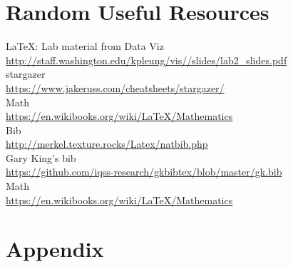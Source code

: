 \documentclass[12pt]{article}
\theoremstyle{hypotheses}
\begin{document}
\section{Random Useful Resources}
\LaTeX: Lab material from Data Viz \\
\url{http://staff.washington.edu/kpleung/vis//slides/lab2_slides.pdf} \\
stargazer\\
\url{https://www.jakeruss.com/cheatsheets/stargazer/}\\
Math\\
\url{https://en.wikibooks.org/wiki/LaTeX/Mathematics}\\
Bib \\
\url{http://merkel.texture.rocks/Latex/natbib.php} \\
Gary King's bib\\
\url{https://github.com/iqss-research/gkbibtex/blob/master/gk.bib}\\
Math\\
\url{https://en.wikibooks.org/wiki/LaTeX/Mathematics}\\

\clearpage





\clearpage



\appendix
\section*{Appendix}
\setcounter{secnumdepth}{0}
\setcounter{table}{0}
\setcounter{figure}{0}
\renewcommand{\thetable}{A\arabic{table}}
\renewcommand{\thefigure}{A\arabic{figure}}
\end{document}
